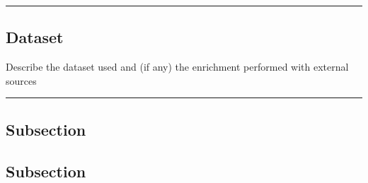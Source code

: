 {\color{gray}\hrule}
\begin{center}
\section{Dataset}
Describe the dataset used and (if any) the enrichment performed with external sources

\bigskip
\end{center}

{\color{gray}\hrule}
\begin{multicols}{2}
\subsection{Subsection}

\subsection{Subsection}

\end{multicols}